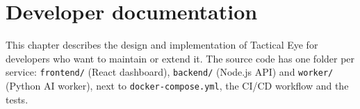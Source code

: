 \chapter{Developer documentation}
\label{ch:developer}

This chapter describes the design and implementation of Tactical Eye for developers who want to maintain or extend it. The source code has one folder per service: \texttt{frontend/} (React dashboard), \texttt{backend/} (Node.js API) and \texttt{worker/} (Python AI worker), next to \texttt{docker-compose.\allowbreak{}yml}, the CI/CD workflow and the tests.





